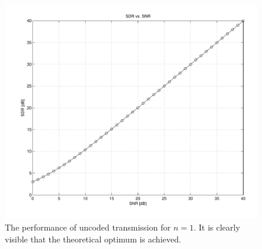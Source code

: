 \begin{figure}
  \begin{center}
    \includegraphics[width=\textwidth]{figures/matlab/ex_uncoded.pdf}
  \end{center}
  \caption{The performance of uncoded transmission for $n=1$. It is clearly
  visible that the theoretical optimum is achieved.}
  \label{fig:uncoded}
\end{figure}


